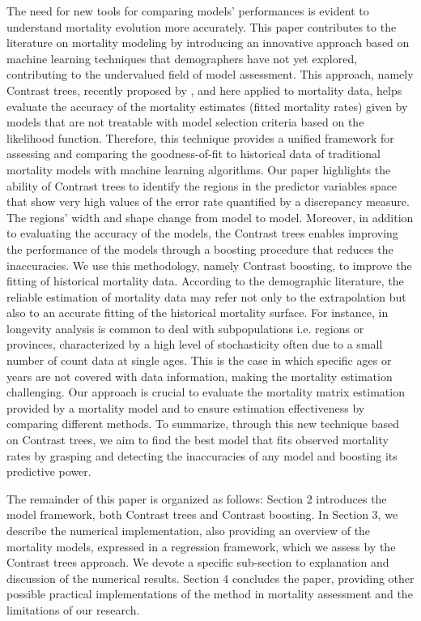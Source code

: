 \documentclass[fleqn,10pt]{wlscirep}
\begin{document}
The need for new tools for comparing models' performances is evident to understand mortality evolution more accurately. 
This paper contributes to the literature on mortality modeling by introducing an innovative approach based on machine learning techniques that demographers have not yet explored, contributing to the undervalued field of model assessment. 
\color{blue}
This approach, namely Contrast trees, recently proposed by \cite{Friedman2020}, and here applied to mortality data, helps evaluate the accuracy of the mortality estimates (fitted mortality rates) given by models that are not treatable with model selection criteria based on the likelihood function. Therefore, this technique provides a unified framework for assessing and comparing the goodness-of-fit to historical data of traditional mortality models with machine learning algorithms.
Our paper highlights the ability of Contrast trees to identify the regions in the predictor variables space that show very high values of the error rate quantified by a discrepancy measure. The regions’ width and shape change from model to model. \color{black}
Moreover, in addition to evaluating the accuracy of the models, the Contrast trees enables improving the performance of the models through a boosting procedure that reduces the inaccuracies. We use this methodology, namely Contrast boosting, to improve \color{blue}the fitting of historical mortality data.
According to the demographic literature, the reliable estimation of mortality data may refer not only to the extrapolation but also to an accurate fitting of the historical mortality surface. For instance, in longevity analysis is common to deal with subpopulations i.e. regions or provinces, characterized by a high level of stochasticity often due to a small number of count data at single ages. This is the case in which specific ages or years are not covered with data information, making the mortality estimation challenging. Our approach is crucial to evaluate the mortality matrix estimation provided by a mortality model and to ensure estimation effectiveness by comparing different methods.
To summarize, through this new technique based on Contrast trees, we aim to find the best model that fits observed mortality rates by grasping and detecting the inaccuracies of any model and boosting its predictive power. \color{black}

The remainder of this paper is organized as follows: Section 2 introduces the model framework, both Contrast trees and Contrast boosting. 
In Section 3, we describe the numerical implementation, also providing an overview of the mortality models, expressed in a regression framework, which we assess by the Contrast trees approach. We devote a specific sub-section to explanation and discussion of the numerical results. 
Section 4 concludes the paper, providing other possible practical implementations of the method in mortality assessment and the limitations of our research.
\end{document}
